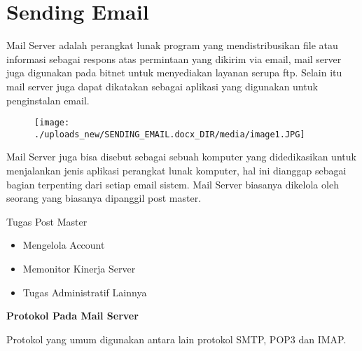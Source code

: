 \documentclass{wileySix}
\begin{document}
\chapter{Sending Email}
\par
Mail Server adalah perangkat lunak program yang mendistribusikan file atau informasi sebagai respons atas permintaan yang dikirim via email, mail server juga digunakan pada bitnet untuk menyediakan layanan serupa ftp. Selain itu mail server juga dapat dikatakan sebagai aplikasi yang digunakan untuk penginstalan email.  \par
\vspace{12pt}
\begin{center}
	
	
	
	\begin{figure}[H]
		\begin{center}
			\texttt{[image: ./uploads\_new/SENDING\_EMAIL.docx\_DIR/media/image1.JPG]}
		\end{center}
	\end{figure}
	
	
	
	
\end{center}\vspace{12pt}
\vspace{12pt}
Mail Server juga bisa disebut sebagai sebuah komputer yang didedikasikan untuk menjalankan jenis aplikasi perangkat lunak komputer, hal ini dianggap sebagai bagian terpenting dari setiap email sistem. Mail Server biasanya dikelola oleh seorang yang biasanya dipanggil post master. \par
\vspace{12pt}
\noindent 
Tugas Post Master  \par
\noindent 
\begin{itemize}
	\item Mengelola Account \par
	\noindent 
	\item Memonitor Kinerja Server \par
	\noindent 
	\item Tugas Administratif Lainnya\end{itemize}
\par
\vspace{12pt}
\noindent 
\textbf{Protokol Pada Mail Server} \par
\noindent 
Protokol yang umum digunakan antara lain protokol SMTP, POP3 dan IMAP. \par
\end{document}
